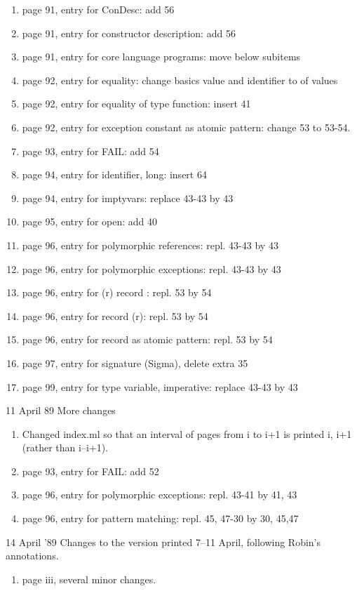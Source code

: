 \begin{description}
\begin{enumerate}
\item page 91, entry for ConDesc: add 56
\item page 91, entry for constructor description: add 56
\item page 91, entry for core language programs: move below subitems
\item page 92, entry for equality: change basics value and identifier
      to of values
\item page 92, entry for equality of type function: insert 41
\item page 92, entry for exception constant as atomic pattern: change
      53 to 53-54.
\item page 93, entry for FAIL: add 54
\item page 94, entry for identifier, long: insert 64
\item page 94, entry for imptyvars: replace 43-43 by 43
\item page 95, entry for open: add 40
\item page 96, entry for polymorphic references: repl. 43-43 by 43
\item page 96, entry for polymorphic exceptions: repl. 43-43 by 43
\item page 96, entry for (r) record : repl. 53 by 54
\item page 96, entry for  record (r): repl. 53 by 54
\item page 96, entry for record as atomic pattern: repl. 53 by 54
\item page 97, entry for signature (Sigma), delete extra 35
\item page 99, entry for type variable, imperative: replace 43-43 by 43
\end{enumerate}
\item{11 April 89} More changes
\begin{enumerate}
\item Changed index.ml so that an interval of pages from i to i+1 is
      printed i, i+1 (rather than i--i+1).
\item page 93, entry for FAIL: add 52
\item page 96, entry for polymorphic exceptions: repl. 43-41 by 41, 43
\item page 96, entry for pattern matching: repl. 45, 47-30 by 30, 45,47
\end{enumerate}
\item{14 April '89} Changes to the version printed 7--11 April, following
Robin's annotations.
\begin{enumerate}
\item page iii, several minor changes.

\end{enumerate}
\end{description}
